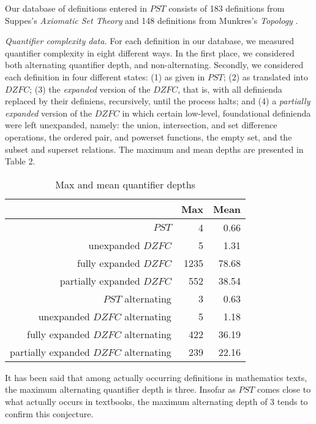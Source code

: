 \documentclass{llncs}
\newcommand{\na}[1]{\mathit{#1}}    \newcommand{\fn}[1]{\mathit{#1}}    \newcommand{\ax}[1]{\mathit{(#1)}}  \newcommand{\mdl}[1]{\mathcal{#1}}
\begin{document}
Our database of definitions entered in $\na{PST}$ consists of 183
definitions from Suppes's \emph{Axiomatic Set Theory} \cite{suppes}
and 148 definitions from Munkres's \emph{Topology} \cite{munkres}.

\medskip

\noindent \emph{Quantifier complexity data.} For each definition in
our database, we measured quantifier complexity in eight different
ways. In the first place, we considered both alternating quantifier
depth, and non-alternating. Secondly, we considered each definition in
four different states: (1) as given in $\na{PST}$; (2) as translated
into $\na{DZFC}$; (3) the \emph{expanded} version of the $\na{DZFC}$,
that is, with all definienda replaced by their definiens, recursively,
until the process halts; and (4) a \emph{partially expanded} version
of the $\na{DZFC}$ in which certain low-level, foundational definienda
were left unexpanded, namely: the union, intersection, and set
difference operations, the ordered pair, and powerset functions, the
empty set, and the subset and superset relations. The maximum and mean
depths are presented in Table 2.

\begin{table}
\label{qDepths}
\begin{center}
\caption{Max and mean quantifier depths}
\begin{tabular}{|r|r|r|}
\hline
 & Max & Mean \\\hline
$\na{PST}$ & 4 & 0.66 \\
unexpanded $\na{DZFC}$ & 5 & 1.31 \\
fully expanded $\na{DZFC}$ & 1235 & 78.68 \\
partially expanded $\na{DZFC}$ & 552 & 38.54 \\\hline
$\na{PST}$ alternating & 3 & 0.63 \\
unexpanded $\na{DZFC}$ alternating & 5 & 1.18 \\
fully expanded $\na{DZFC}$ alternating & 422 & 36.19 \\
partially expanded $\na{DZFC}$ alternating & 239 & 22.16 \\
\hline
\end{tabular}
\end{center}
\end{table}
It has been said that among actually occurring definitions in
mathematics texts, the maximum alternating quantifier depth is three.
Insofar as $\na{PST}$ comes close to what actually occurs in
textbooks, the maximum alternating depth of 3 tends to
confirm this conjecture.
\end{document}
